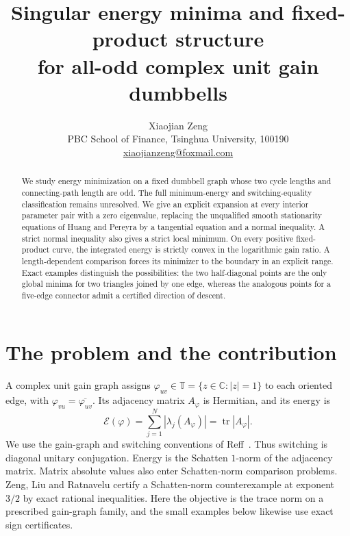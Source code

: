 \documentclass[11pt,a4paper]{article}
\title{Singular energy minima and fixed-product structure\\
for all-odd complex unit gain dumbbells}
\author{Xiaojian Zeng\\
\small PBC School of Finance, Tsinghua University, 100190\\
\small \href{mailto:xiaojianzeng@foxmail.com}{xiaojianzeng@foxmail.com}}
\date{}
\theoremstyle{remark}
\DeclareMathOperator{\tr}{tr}
\newcommand{\E}{\mathcal E}
\newcommand{\T}{\mathbb T}
\begin{document}
\maketitle
\begin{abstract}
We study energy minimization on a fixed dumbbell graph whose two cycle
lengths and connecting-path length are odd. The full minimum-energy and
switching-equality classification remains unresolved. We give an explicit
expansion at every interior parameter pair with a zero eigenvalue, replacing
the unqualified smooth stationarity equations of Huang and Pereyra by a
tangential equation and a normal inequality. A strict normal inequality
also gives a strict local minimum. On every positive fixed-product curve,
the integrated energy is strictly convex in the logarithmic gain ratio.
A length-dependent comparison forces its minimizer to the boundary in an
explicit range. Exact examples distinguish the possibilities: the two
half-diagonal points are the only global minima for two triangles joined
by one edge, whereas the analogous points for a five-edge connector admit
a certified direction of descent.
\end{abstract}

\section{The problem and the contribution}

A complex unit gain graph assigns $\varphi_{uv}\in\T=\{z\in\mathbb C:|z|=1\}$
to each oriented edge, with $\varphi_{vu}=\overline{\varphi_{uv}}$.
Its adjacency matrix $A_\varphi$ is Hermitian, and its energy is
\[
 \E(\varphi)=\sum_{j=1}^{N}|\lambda_j(A_\varphi)|
            =\tr|A_\varphi|.
\]
We use the gain-graph and switching conventions of Reff~\cite{Reff2012}.
Thus switching is diagonal unitary conjugation. Energy is the Schatten
$1$-norm of the adjacency matrix. Matrix absolute values also enter
Schatten-norm comparison problems. Zeng, Liu and Ratnavelu
\cite{ZengLiuRatnavelu2026} certify a Schatten-norm counterexample at exponent
$3/2$ by exact rational inequalities. Here the objective
is the trace norm on a prescribed gain-graph family, and the small
examples below likewise use exact sign certificates.
\end{document}
